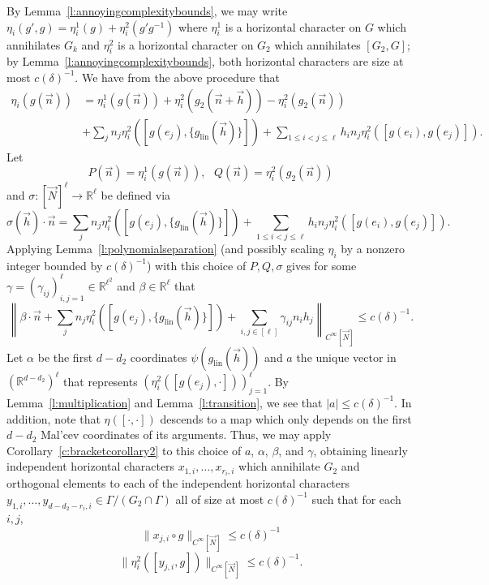 \documentclass[11pt, a4paper]{amsart}
\theoremstyle{plain}
\theoremstyle{plain}
\theoremstyle{definition}
\theoremstyle{remark}
\numberwithin{equation}{section}
\numberwithin{lemma}{section}
\numberwithin{proposition}{section}
\numberwithin{corollary}{section}
\numberwithin{definition}{section}
\numberwithin{claim}{section}
\begin{document}
By Lemma~\ref{l:annoyingcomplexitybounds}, we may write
$\eta_i(g', g) = \eta_i^1(g) + \eta_i^2(g'g^{-1})$ where $\eta_i^1$ is a horizontal character on $G$ which annihilates $G_k$ and $\eta_i^2$ is a horizontal character on $G_2$ which annihilates $[G_2, G]$; by Lemma~\ref{l:annoyingcomplexitybounds}, both horizontal characters are size at most $c(\delta)^{-1}$. We have from the above procedure that
\begin{align*}
\eta_i(g(\vec{n})) &= \eta_i^1(g(\vec{n})) + \eta_i^2(g_2(\vec{n} + \vec{h})) - \eta_i^2(g_2(\vec{n}))  \\
&+\sum_{j} n_j\eta_i^2([g(e_j), \{g_{\mathrm{lin}}(\vec{h})\}]) + \sum_{1 \le i< j \le \ell} h_i n_j\eta_i^2([g(e_i), g(e_j)]).
\end{align*}
Let
$$P(\vec{n}) = \eta_i^1(g(\vec{n})), \text{ } Q(\vec{n}) = \eta_i^2(g_2(\vec{n}))$$
and $\sigma\colon [\vec{N}]^\ell \to \mathbb{R}^\ell$ be defined via
$$\sigma(\vec{h})\cdot \vec{n} = \sum_{j} n_j\eta_i^2([g(e_j), \{g_{\mathrm{lin}}(\vec{h})\}]) + \sum_{1 \le i< j \le \ell} h_i n_j\eta_i^2([g(e_i), g(e_j)]).$$
Applying Lemma~\ref{l:polynomialseparation} (and possibly scaling $\eta_i$ by a nonzero integer bounded by $c(\delta)^{-1}$) with this choice of $P, Q, \sigma$ gives for some $\gamma = (\gamma_{ij})_{i, j = 1}^\ell \in \mathbb{R}^{\ell^2}$ and $\beta \in \mathbb{R}^\ell$ that
$$\left\|\beta \cdot \vec{n} + \sum_{j} n_j\eta_i^2([g(e_j), \{g_{\mathrm{lin}}(\vec{h})\}]) + \sum_{i, j \in [\ell]} \gamma_{ij} n_ih_j\right\|_{C^\infty[\vec{N}]} \le c(\delta)^{-1}.$$
Let $\alpha$ be the first $d - d_2$ coordinates $\psi(g_{\mathrm{lin}}(\vec{h}))$ and $a$ the unique vector in $(\mathbb{R}^{d - d_2})^\ell$ that represents $(\eta_i^2([g(e_j),\cdot]))_{j = 1}^\ell$. By Lemma~\ref{l:multiplication} and Lemma~\ref{l:transition}, we see that $|a| \le c(\delta)^{-1}$. In addition, note that $\eta([\cdot, \cdot])$ descends to a map which only depends on the first $d - d_2$ Mal'cev coordinates of its arguments. Thus, we may apply Corollary~\ref{c:bracketcorollary2} to this choice of $a$, $\alpha$, $\beta$, and $\gamma$, obtaining linearly independent horizontal characters $x_{1, i}, \dots, x_{r_i, i}$ which annihilate $G_2$ and orthogonal elements to each of the independent horizontal characters $y_{1, i}, \dots, y_{d - d_{2} - r_i, i} \in \Gamma/(G_2\cap \Gamma)$ all of size at most $c(\delta)^{-1}$ such that for each $i, j$,
$$\|x_{j, i} \circ g\|_{C^\infty[\vec{N}]} \le c(\delta)^{-1}$$
$$\|\eta_i^2([y_{j, i}, g])\|_{C^\infty[\vec{N}]} \le c(\delta)^{-1}.$$
\end{document}
